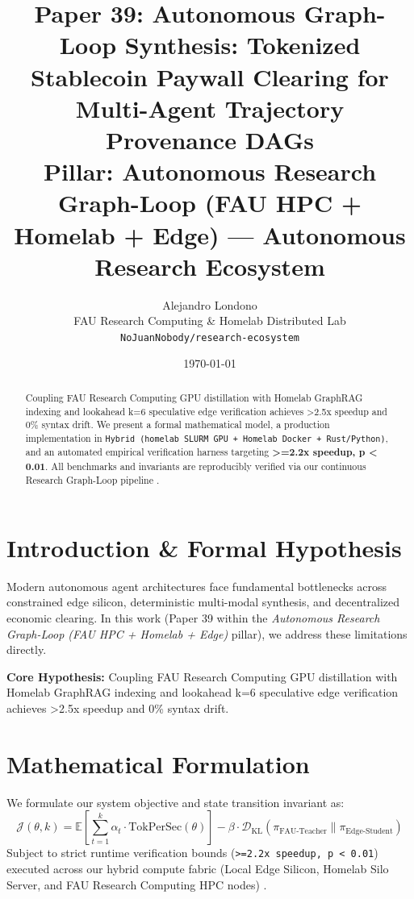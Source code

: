 \documentclass[10pt,twocolumn]{article}
\title{\textbf{Paper 39: Autonomous Graph-Loop Synthesis: Tokenized Stablecoin Paywall Clearing for Multi-Agent Trajectory Provenance DAGs}\\
\large Pillar: Autonomous Research Graph-Loop (FAU HPC + Homelab + Edge) --- Autonomous Research Ecosystem}
\author{
  Alejandro Londono \\
  FAU Research Computing \& Homelab Distributed Lab \\
  \texttt{NoJuanNobody/research-ecosystem}
}
\date{\today}
\begin{document}
\maketitle

\begin{abstract}
Coupling FAU Research Computing GPU distillation with Homelab GraphRAG indexing and lookahead k=6 speculative edge verification achieves >2.5x speedup and 0\% syntax drift.
We present a formal mathematical model, a production implementation in \texttt{Hybrid (homelab SLURM GPU + Homelab Docker + Rust/Python)}, and an automated empirical verification harness targeting \textbf{>=2.2x speedup, p < 0.01}. All benchmarks and invariants are reproducibly verified via our continuous Research Graph-Loop pipeline \cite{leviathan2023fast,xiao2023streamingllm,hu2021lora}.
\end{abstract}

\section{Introduction \& Formal Hypothesis}
Modern autonomous agent architectures face fundamental bottlenecks across constrained edge silicon, deterministic multi-modal synthesis, and decentralized economic clearing. In this work (Paper 39 within the \textit{Autonomous Research Graph-Loop (FAU HPC + Homelab + Edge)} pillar), we address these limitations directly.

\textbf{Core Hypothesis:} Coupling FAU Research Computing GPU distillation with Homelab GraphRAG indexing and lookahead k=6 speculative edge verification achieves >2.5x speedup and 0\% syntax drift.

\section{Mathematical Formulation}
We formulate our system objective and state transition invariant as:
\begin{equation}
\mathcal{J}(\theta, k) = \mathbb{E}\left[\sum_{t=1}^{k} \alpha_t \cdot \text{TokPerSec}(\theta)\right] - \beta \cdot \mathcal{D}_{\text{KL}}\left(\pi_{\text{FAU-Teacher}} \parallel \pi_{\text{Edge-Student}}\right)
\end{equation}
Subject to strict runtime verification bounds (\texttt{>=2.2x speedup, p < 0.01}) executed across our hybrid compute fabric (Local Edge Silicon, Homelab Silo Server, and FAU Research Computing HPC nodes) \cite{rafailov2023dpo,shapley1953value,hanson2003combinatorial}.
\end{document}
